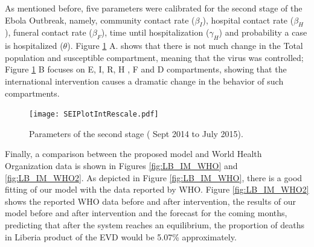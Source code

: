 \noindent As mentioned before, five parameters were calibrated for the second stage of the Ebola Outbreak, namely, community contact rate ($\beta_I$), hospital contact rate ($\beta_H$), funeral contact rate ($\beta_F$), time until hospitalization ($\gamma_H$) and probability a case is hospitalized ($\theta$). Figure \ref{fig:LB_IM_In} A. shows that there is not much change in the Total population and susceptible compartment, meaning that the virus was controlled;  Figure \ref{fig:LB_IM_In} B focuses on E, I, R, H , F and D compartments, showing that the international intervention causes a dramatic change in the behavior of such compartments.


\begin{figure}[h!]
  \centering
  \texttt{[image: SEIPlotIntRescale.pdf]} 
\caption{ Parameters of the second stage ( Sept 2014 to July 2015).} 
\label{fig:LB_IM_In} 
\end{figure}






\noindent Finally, a comparison between the proposed model and World Health Organization data is shown in Figures \ref{fig:LB_IM_WHO} and \ref{fig:LB_IM_WHO2}. As depicted in Figure \ref{fig:LB_IM_WHO}, there is a good fitting of our model with the data reported by WHO. Figure \ref{fig:LB_IM_WHO2} shows  the reported WHO data before and after intervention, the results of our model before and after intervention and the forecast for the coming months, predicting that after the system reaches an equilibrium, the proportion of deaths in Liberia product of the EVD would be 5.07\% approximately.




